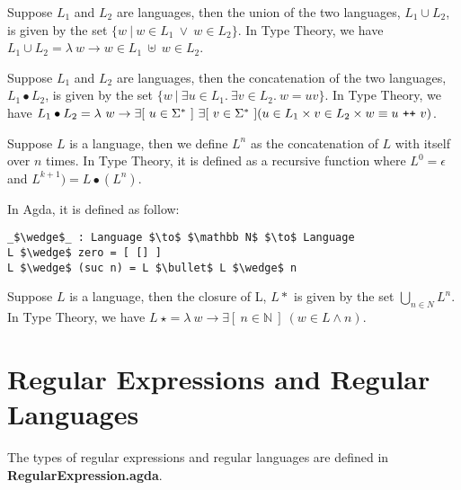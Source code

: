 \begin{defn} 
\label{defn:lang_union}
\noindent Suppose \(L_1\) and \(L_2\) are languages, then the union of
the two languages, \(L_1\cup L_2\), is given by the set \(\{w\
|\  w \in L_1\ \vee \ w \in L_2\}\). In Type Theory, we have \(L_1 \cup L_2 = \lambda\ w
\to w \in L_1\ \uplus\ w \in L_2\).
\end{defn}

\begin{defn}
\label{defn:lang_con}
\noindent Suppose \(L_1\) and \(L_2\) are languages, then
the concatenation of the two languages, \(L_1\bullet L_2\), is given
by the set \(\{w\  |\  \exists u\in L_1.\ \exists v\in L_2.\ w = uv\}\). In
Type Theory, we have \(L_1\bullet L_2 = \lambda\ w \to \exists[\
u \in \Sigma^*\ ]\ \exists[\ v \in \Sigma^*\ ] (u \in L_1 \times v \in
L_2 \times w \equiv u\ \texttt{+}\texttt{+}\  v )\).
\end{defn}

\begin{defn}
\label{defn:lang_power}
\noindent Suppose \(L\) is a language, then we define \(L^n\) as
the concatenation of \(L\) with itself over \(n\) times. In Type
Theory, it is defined as a recursive function where \(L^0 = \epsilon\) and
\(L^{k+1}) = L \bullet (L^n)\). 
\end{defn}

\par In Agda, it is defined as follow:
\begin{lstlisting}[mathescape=true,xleftmargin=.3\textwidth]
_$\wedge$_ : Language $\to$ $\mathbb N$ $\to$ Language
L $\wedge$ zero = [ [] ]
L $\wedge$ (suc n) = L $\bullet$ L $\wedge$ n
\end{lstlisting} 


\begin{defn}
\label{defn:lang_star}
\noindent Suppose \(L\) is a language, then the closure of
L, \(L\ast\) is given by the set \(\bigcup_{n \in N} L^n\). In Type
Theory, we have \(L\ \star = \lambda\ w \to \exists [\ n \in \mathbb{N}\
]\ (w \in L \wedge n)\). 
\end{defn}


\section{Regular Expressions and Regular Languages}
\par The types of regular expressions and regular languages are defined in
\textbf{RegularExpression.agda}. 

